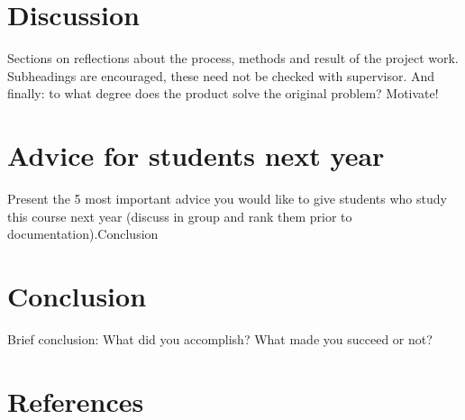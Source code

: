 \documentclass[12pt]{article}
\begin{document}
\section{Discussion}
Sections on reflections about the process, methods and result of the project work. Subheadings are encouraged, these need not be checked with supervisor. And finally: to what degree does the product solve the original problem? Motivate!

\section{Advice for students next year}
Present the 5 most important advice you would like to give students who study this course next year (discuss in group and rank them prior to documentation).Conclusion

\section{Conclusion}
Brief conclusion: What did you accomplish? What made you succeed or not? 

\section{References}






\end{document}
